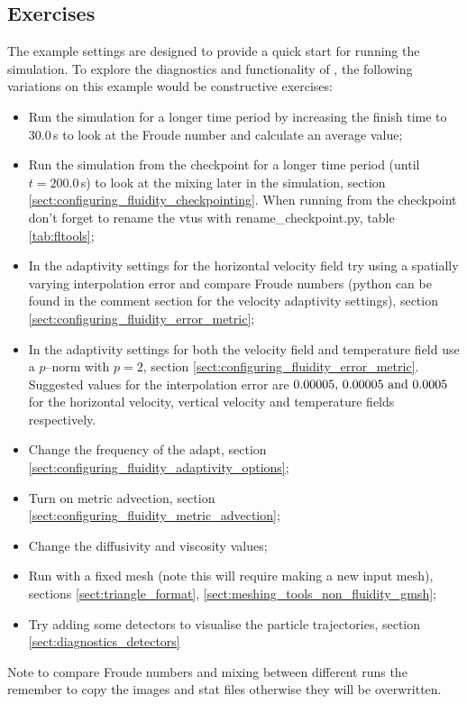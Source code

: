 \subsection{Exercises}
\label{sect:le_exercises}
The example settings are designed to provide a quick start for running the simulation. To explore the diagnostics and functionality of \fluidity, the following variations on this example would be constructive exercises:
\begin{itemize}
\item Run the simulation for a longer time period by increasing the finish time to $30.0\,$s to look at the Froude number and calculate an average value;
\item Run the simulation from the checkpoint for a longer time period (until $t=200.0\,$s) to look at the mixing later in the simulation, section \ref{sect:configuring_fluidity_checkpointing}. When running from the checkpoint don't forget to rename the vtus with rename\_checkpoint.py, table \ref{tab:fltools};
\item In the adaptivity settings for the horizontal velocity field try using a spatially varying interpolation error and compare Froude numbers (python can be found in the comment section for the velocity adaptivity settings), section \ref{sect:configuring_fluidity_error_metric};
\item In the adaptivity settings for both the velocity field and temperature field use a $p$--norm with \mbox{$p=2$}, section \ref{sect:configuring_fluidity_error_metric}. Suggested values for the interpolation error are $0.00005, \, 0.00005 \,\, {\rm and} \,\, 0.0005$ for the horizontal velocity, vertical velocity and temperature fields respectively. 
\item Change the frequency of the adapt, section \ref{sect:configuring_fluidity_adaptivity_options};
\item Turn on metric advection, section \ref{sect:configuring_fluidity_metric_advection};
\item Change the diffusivity and viscosity values;
\item Run with a fixed mesh (note this will require making a new input mesh), sections \ref{sect:triangle_format}, \ref{sect:meshing_tools_non_fluidity_gmsh};
\item Try adding some detectors to visualise the particle trajectories, section \ref{sect:diagnostics_detectors} %
\end{itemize}
Note to compare Froude numbers and mixing between different runs the remember to copy the images and stat files otherwise they will be overwritten.
 
